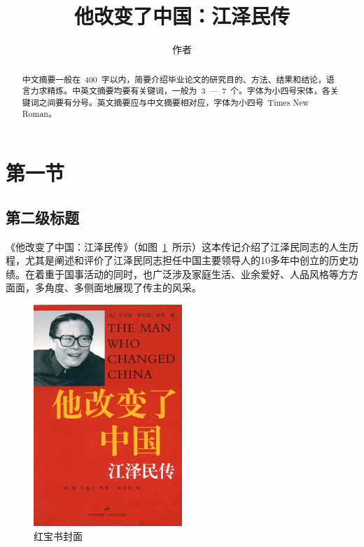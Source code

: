 \baselineskip=20pt
\title{他改变了中国：江泽民传}    	%
\author{作者}            					%
\makecover
\begin{abstract}
\par\setlength{\parindent}{2em} 中文摘要一般在~400~字以内，简要介绍毕业论文的研究目的、方法、结果和结论，语言力求精炼。中英文摘要均要有关键词，一般为~3~—~7~个。字体为小四号宋体，各关键词之间要有分号。英文摘要应与中文摘要相对应，字体为小四号~Times New Roman。
\end{abstract}

\section{第一节}
\subsection{第二级标题}
《他改变了中国：江泽民传》（如图~\ref{book}~所示）这本传记介绍了江泽民同志的人生历程，尤其是阐述和评价了江泽民同志担任中国主要领导人的10多年中创立的历史功绩。在着重于国事活动的同时，也广泛涉及家庭生活、业余爱好、人品风格等方方面面，多角度、多侧面地展现了传主的风采。

\begin{figure}[htbp!]
	\centering
	\includegraphics[width=0.5\textwidth]{figures/The_Man_Who_Changed_China.png}
	\caption{红宝书封面}\label{book}
	\vspace{-1em}
\end{figure}	

